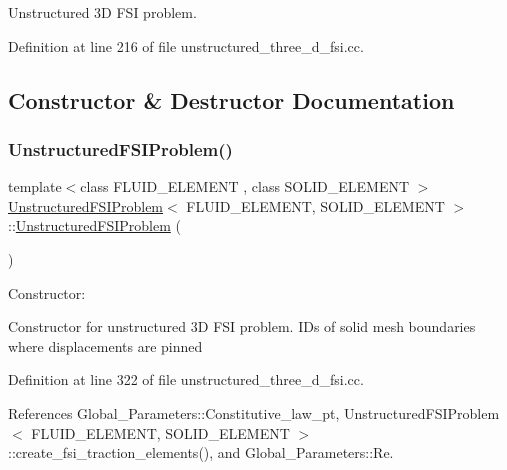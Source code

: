 Unstructured 3D F\+SI problem. 

Definition at line 216 of file unstructured\+\_\+three\+\_\+d\+\_\+fsi.\+cc.



\subsection{Constructor \& Destructor Documentation}
\mbox{\label{classUnstructuredFSIProblem_a6a31fd839e0215ef1312942cf7284bd2}} 
\subsubsection{\texorpdfstring{Unstructured\+F\+S\+I\+Problem()}{UnstructuredFSIProblem()}}
{\footnotesize\ttfamily template$<$class F\+L\+U\+I\+D\+\_\+\+E\+L\+E\+M\+E\+NT , class S\+O\+L\+I\+D\+\_\+\+E\+L\+E\+M\+E\+NT $>$ \\
\hyperlink{classUnstructuredFSIProblem}{Unstructured\+F\+S\+I\+Problem}$<$ F\+L\+U\+I\+D\+\_\+\+E\+L\+E\+M\+E\+NT, S\+O\+L\+I\+D\+\_\+\+E\+L\+E\+M\+E\+NT $>$\+::\hyperlink{classUnstructuredFSIProblem}{Unstructured\+F\+S\+I\+Problem} (\begin{DoxyParamCaption}{ }\end{DoxyParamCaption})}



Constructor\+: 

Constructor for unstructured 3D F\+SI problem. I\+Ds of solid mesh boundaries where displacements are pinned 

Definition at line 322 of file unstructured\+\_\+three\+\_\+d\+\_\+fsi.\+cc.



References Global\+\_\+\+Parameters\+::\+Constitutive\+\_\+law\+\_\+pt, Unstructured\+F\+S\+I\+Problem$<$ F\+L\+U\+I\+D\+\_\+\+E\+L\+E\+M\+E\+N\+T, S\+O\+L\+I\+D\+\_\+\+E\+L\+E\+M\+E\+N\+T $>$\+::create\+\_\+fsi\+\_\+traction\+\_\+elements(), and Global\+\_\+\+Parameters\+::\+Re.

\mbox{\label{classUnstructuredFSIProblem_a976a81e0dee902f6713bd8ca4d79d000}} 
